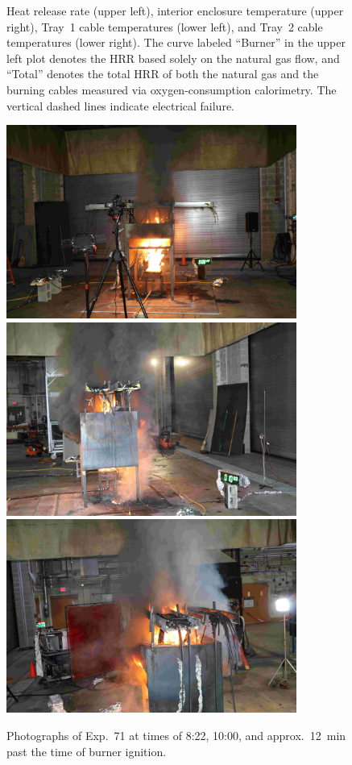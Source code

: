 \begin{figure}[H]
\caption[HRR and temperatures of Exp.~71]{Heat release rate (upper left), interior enclosure temperature (upper right), Tray~1 cable temperatures (lower left), and Tray~2 cable temperatures (lower right). The curve labeled ``Burner'' in the upper left plot denotes the HRR based solely on the natural gas flow, and ``Total'' denotes the total HRR of both the natural gas and the burning cables measured via oxygen-consumption calorimetry. The vertical dashed lines indicate electrical failure.}
\label{fig:Test_71}
\end{figure}

\begin{figure}[p]
\centering
\includegraphics[height=2.50in]{../FIGURES/Test_71_Photo_1} \\ \vspace{0.1in}
\includegraphics[height=2.50in]{../FIGURES/Test_71_Photo_2} \\ \vspace{0.1in}
\includegraphics[height=2.50in]{../FIGURES/Test_71_Photo_3}
\caption[Photographs of Exp.~71]{Photographs of Exp.~71 at times of 8:22, 10:00, and approx.~12~min past the time of burner ignition.}
\label{fig:Test_71_photos}
\end{figure}



